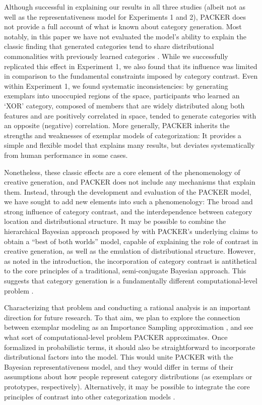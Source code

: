 \documentclass[12pt]{article}
\begin{document}
\begin{flushleft}
Although successful in explaining our results in all three studies (albeit not
as well as the representativeness model for Experiments 1 and 2), PACKER does
not provide a full account of what is known about category generation. Most
notably, in this paper we have not evaluated the model's ability to explain the
classic finding that generated categories tend to share distributional
commonalities with previously learned categories
\citep[see][]{jern2013probabilistic,ward1994structured}. While we successfully
replicated this effect in Experiment 1, we also found that its influence was
limited in comparison to the fundamental constraints imposed by category
contrast. Even within Experiment 1, we found systematic inconsistencies: by
generating exemplars into unoccupied regions of the space, participants who
learned an `XOR' category, composed of members that are widely distributed along
both features and are positively correlated in space, tended to generate
categories with an opposite (negative) correlation. More generally, PACKER
inherits the strengths and weaknesses of exemplar models of categorization: It
provides a simple and flexible model that explains many results, but deviates
systematically from human performance in some cases.

Nonetheless, these classic effects are a core element of the phenomenology of
creative generation, and PACKER does not include any mechanisms that explain
them. Instead, through the development and evaluation of the PACKER model, we
have sought to add new elements into such a phenomenology: The broad and strong
influence of category contrast, and the interdependence between category
location and distributional structure. It may be possible to combine the
hierarchical Bayesian approach proposed by \cite{jern2013probabilistic} with
PACKER's underlying claims to obtain a ``best of both worlds'' model, capable of
explaining the role of contrast in creative generation, as well as the emulation
of distributional structure. However, as noted in the introduction, the
incorporation of category contrast is antithetical to the core principles of a
traditional, semi-conjugate Bayesian approach. This suggests that category
generation is a fundamentally different computational-level problem
\citep[different from those posed by][]{jern2013probabilistic,kemp2014taxonomy}.

Characterizing that problem and conducting a rational analysis is an important
direction for future research. To that aim, we plan to explore the connection
between exemplar modeling as an Importance Sampling approximation
\citep{shi10exemplar}, and see what sort of computational-level problem PACKER
approximates. Once formalized in probabilistic terms, it should also be
straightforward to incorporate distributional factors into the model. This would
unite PACKER with the Bayesian representativeness model, and they would differ
in terms of their assumptions about how people represent category distributions
(as exemplars or prototypes, respectively). Alternatively, it may be possible to
integrate the core principles of contrast into other categorization models
\citep[e.g.,][]{love2004sustain,kurtz2007divergent,smith2000thirty}.


\end{flushleft}
\end{document}
